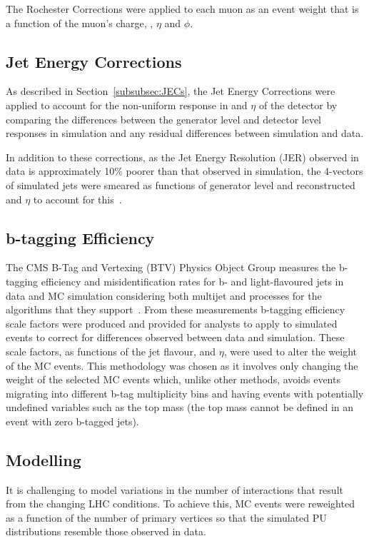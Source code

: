 The Rochester Corrections were applied to each muon as an event weight that is a function of the muon's charge, \pt, $\eta$ and $\phi$.

\subsection{Jet Energy Corrections}\label{subsec:jesjer}
As described in Section~\ref{subsubsec:JECs}, the Jet Energy Corrections were applied to account for the non-uniform response in \pT and $\eta$ of the detector by comparing the differences between the generator level and detector level responses in simulation and any residual differences between simulation and data.

In addition to these corrections, as the Jet Energy Resolution (JER) observed in data is approximately 10\% poorer than that observed in simulation, the 4-vectors of simulated jets were smeared as functions of generator level and reconstructed \pt and $\eta$ to account for this~\cite{Khachatryan:2016kdb}.

\subsection{b-tagging Efficiency}\label{subsec:btagEff}
The CMS B-Tag and Vertexing (BTV) Physics Object Group measures the b-tagging efficiency and misidentification rates for b- and light-flavoured jets in data and MC simulation considering both multijet and \ttbar processes for the algorithms that they support~\cite{Sirunyan:2017ezt}.
From these measurements b-tagging efficiency scale factors were produced and provided for analysts to apply to simulated events to correct for differences observed between data and simulation.
These scale factors, as functions of the jet flavour, \pT and $\eta$, were used to alter the weight of the MC events.
This methodology was chosen as it involves only changing the weight of the selected MC events which, unlike other methods, avoids events migrating into different b-tag multiplicity bins and having events with potentially undefined variables such as the top mass (\ie the top mass cannot be defined in an event with zero b-tagged jets).

\subsection{\PU Modelling}\label{subsec:puSF}
It is challenging to model variations in the number of \PU interactions that result from the changing LHC conditions.
To achieve this, MC events were reweighted as a function of the number of primary vertices so that the simulated PU distributions resemble those observed in data.

